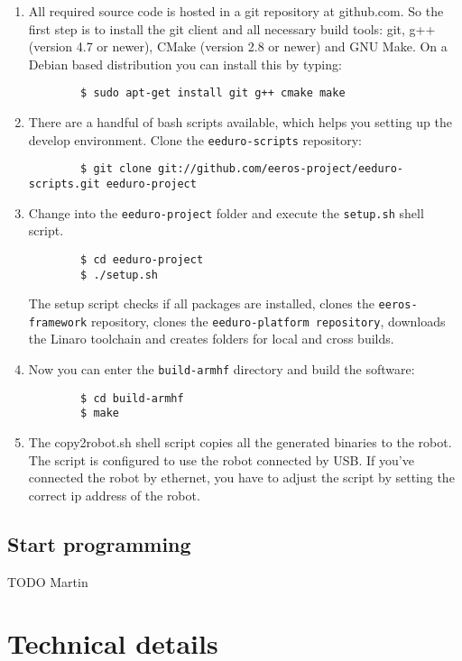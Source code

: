 \begin{enumerate}
	\item All required source code is hosted in a git repository at github.com. So the first step is to install the git client and all necessary build tools: git, g++ (version 4.7 or newer), CMake (version 2.8 or newer) and GNU Make. On a Debian based distribution you can install this by typing:
		\begin{verbatim}
		$ sudo apt-get install git g++ cmake make
		\end{verbatim}
	\item There are a handful of bash scripts available, which helps you setting up the develop environment. Clone the \texttt{eeduro-scripts} repository:
		\begin{verbatim}
		$ git clone git://github.com/eeros-project/eeduro-scripts.git eeduro-project
		\end{verbatim}
	\item Change into the \texttt{eeduro-project} folder and execute the \texttt{setup.sh} shell script.
		\begin{verbatim}
		$ cd eeduro-project
		$ ./setup.sh
		\end{verbatim}
		The setup script checks if all packages are installed, clones the \texttt{eeros-framework} repository, clones the \texttt{eeduro-platform repository}, downloads the Linaro toolchain and creates folders for local and cross builds.
	\item Now you can enter the \texttt{build-armhf} directory and build the software:
		\begin{verbatim}
		$ cd build-armhf
		$ make
		\end{verbatim}
	\item The copy2robot.sh shell script copies all the generated binaries to the robot. The script is configured to use the robot connected by USB. If you've connected the robot by ethernet, you have to adjust the script by setting the correct ip address of the robot.
\end{enumerate}


\section{Start programming}
TODO Martin

\chapter{Technical details}


